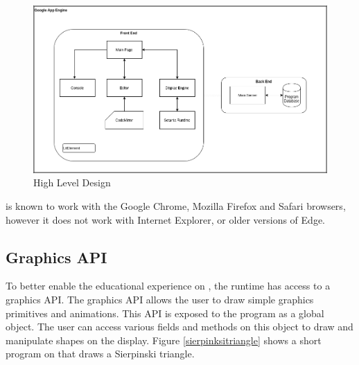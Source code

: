 \begin{figure}
    \caption{\trys{} High Level Design}
    \label{trysetantadiagram}
    \begin{center}
    \includegraphics[scale=0.4]{trysetantadiagram}
    \end{center}
\end{figure}

\trys{} is known to work with the Google Chrome, Mozilla Firefox and Safari browsers, however it does not work with Internet Explorer, or older versions of Edge.

\subsection{Graphics API}

To better enable the educational experience on \trys{}, the \Setanta{} runtime has access to a graphics API. The graphics API allows the user to draw simple graphics primitives and animations. This API is exposed to the \Setanta{} program as a global object. The user can access various fields and methods on this object to draw and manipulate shapes on the display. Figure \ref{sierpinksitriangle} shows a short program on \trys{} that draws a Sierpinski triangle.

